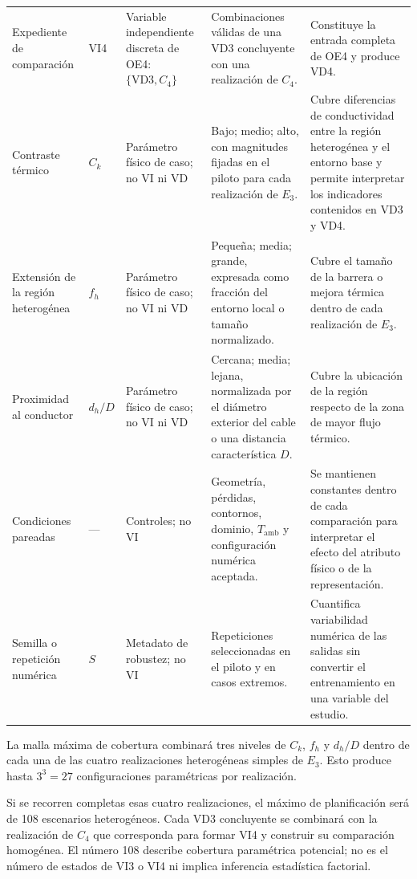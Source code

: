 \begin{longtable}{L{3.10cm}L{1.45cm}L{3.00cm}L{5.15cm}L{5.25cm}}
Expediente de comparación & VI4 & Variable independiente discreta de OE4: $\{\mathrm{VD3},C_4\}$ & Combinaciones válidas de una VD3 concluyente con una realización de $C_4$. & Constituye la entrada completa de OE4 y produce VD4. \\

Contraste térmico & $C_k$ & Parámetro físico de caso; no VI ni VD & Bajo; medio; alto, con magnitudes fijadas en el piloto para cada realización de $E_3$. & Cubre diferencias de conductividad entre la región heterogénea y el entorno base y permite interpretar los indicadores contenidos en VD3 y VD4. \\

Extensión de la región heterogénea & $f_h$ & Parámetro físico de caso; no VI ni VD & Pequeña; media; grande, expresada como fracción del entorno local o tamaño normalizado. & Cubre el tamaño de la barrera o mejora térmica dentro de cada realización de $E_3$. \\

Proximidad al conductor & $d_h/D$ & Parámetro físico de caso; no VI ni VD & Cercana; media; lejana, normalizada por el diámetro exterior del cable o una distancia característica $D$. & Cubre la ubicación de la región respecto de la zona de mayor flujo térmico. \\

Condiciones pareadas & --- & Controles; no VI & Geometría, pérdidas, contornos, dominio, $T_{\mathrm{amb}}$ y configuración numérica aceptada. & Se mantienen constantes dentro de cada comparación para interpretar el efecto del atributo físico o de la representación. \\

Semilla o repetición numérica & $S$ & Metadato de robustez; no VI & Repeticiones seleccionadas en el piloto y en casos extremos. & Cuantifica variabilidad numérica de las salidas sin convertir el entrenamiento en una variable del estudio. \\

\end{longtable}

\tesisbodyfont

La malla máxima de cobertura combinará tres niveles de $C_k$, $f_h$ y $d_h/D$ dentro de cada una de las cuatro realizaciones heterogéneas simples de $E_3$. Esto produce hasta $3^3=27$ configuraciones paramétricas por realización.

Si se recorren completas esas cuatro realizaciones, el máximo de planificación será de 108 escenarios heterogéneos. Cada VD3 concluyente se combinará con la realización de $C_4$ que corresponda para formar VI4 y construir su comparación homogénea. El número 108 describe cobertura paramétrica potencial; no es el número de estados de VI3 o VI4 ni implica inferencia estadística factorial.

